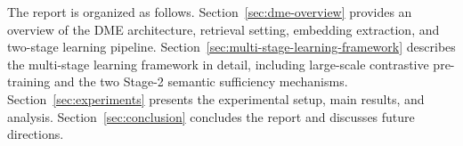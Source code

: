 The report is organized as follows. Section~\ref{sec:dme-overview} provides an overview of the DME architecture, retrieval setting, embedding extraction, and two-stage learning pipeline. Section~\ref{sec:multi-stage-learning-framework} describes the multi-stage learning framework in detail, including large-scale contrastive pre-training and the two Stage-2 semantic sufficiency mechanisms. Section~\ref{sec:experiments} presents the experimental setup, main results, and analysis. Section~\ref{sec:conclusion} concludes the report and discusses future directions.